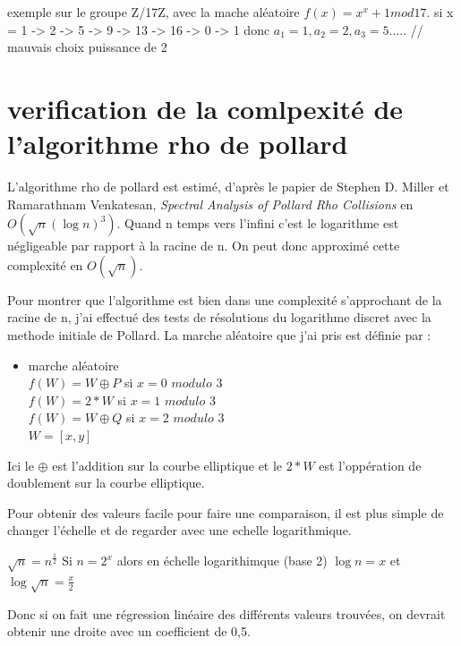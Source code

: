 \documentclass[a4paper,10pt]{report}
\begin{document}
exemple sur le groupe Z/17Z, avec la mache aléatoire $f(x) = x^x + 1 mod 17$.
si x = 1 -> 2 -> 5 -> 9 -> 13 -> 16 -> 0 -> 1
donc $a_1 = 1, a_2 = 2, a_3 = 5 .....$
// mauvais choix puissance de 2

\chapter{verification de la comlpexité de l'algorithme rho de pollard}

L'algorithme rho de pollard est estimé, d'après le papier de Stephen D. Miller et Ramarathnam Venkatesan, \textit{Spectral Analysis of Pollard Rho Collisions} en $O(\sqrt{n}(\log{n})^3)$. 
Quand n temps vers l'infini c'est le logarithme est négligeable par rapport à la racine de n. On peut donc approximé cette complexité en $O(\sqrt{n})$.

Pour montrer que l'algorithme est bien dans une complexité s'approchant de la racine de n, j'ai effectué des tests de résolutions du logarithme discret avec la methode initiale
de Pollard. La marche aléatoire que j'ai pris est définie par : \\
\begin{itemize}
 \item {marche aléatoire}\\
  $ f(W) = W \oplus P$ si $x = 0$ $modulo$ $3$ \\
  $ f(W) = 2*W$ si $x = 1$ $modulo$ $3$ \\
  $ f(W) = W \oplus Q$ si $x = 2$  $modulo$ $3$ \\
  $ W = [x,y] $ \\
\end{itemize}

Ici le $\oplus$ est l'addition sur la courbe elliptique et le $2*W$ est l'oppération de doublement sur la courbe elliptique.

Pour obtenir des valeurs facile pour faire une comparaison, il est plus simple de changer l'échelle et de regarder avec une echelle logarithmique.\\
\begin{center}
 $\sqrt{n} = n^{\frac{1}{2}}$
 Si $n=2^x$ alors en échelle logarithimque (base 2) $\log{n} = x$ et $\log{\sqrt{n}} = \frac{x}{2}$
\end{center}

Donc si on fait une régression linéaire des différents valeurs trouvées, on devrait obtenir une droite avec un coefficient de 0,5.
\end{document}
